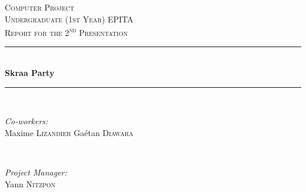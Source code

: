 \documentclass[12pt]{article}
\newcommand{\ts}{\textsuperscript}
\newcommand{\HRule}{\rule{\linewidth}{0.5mm}} %
\begin{document}
\newpage



\begin{center}


 

\textsc{\LARGE Computer Project}\\[1.5cm] %
\textsc{\Large Undergraduate (1st Year) EPITA}\\[0.5cm] %
\textsc{\large Report for the 2\ts{nd} Presentation}\\[0.5cm] %



\HRule \\[0.4cm]
{ \huge \bfseries Skraa Party}\\[0.4cm] %
\HRule \\[1.5cm]
 

\begin{minipage}{0.4\textwidth}
\begin{flushleft} \large
\emph{Co-workers:}\\
Maxime \textsc{Lizandier} %
Ga\'etan \textsc{Diawara}
\end{flushleft}
\end{minipage}
~
\begin{minipage}{0.4\textwidth}
\begin{flushright} \large
\emph{Project Manager:} \\
Yann \textsc{Nitzpon} %
\end{flushright}
\end{minipage}\\[2cm]

\end{center}


\newpage
\end{document}
